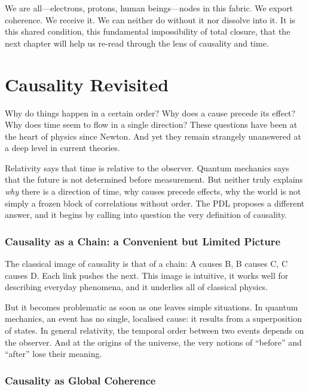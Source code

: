 \documentclass[12pt, a4paper, openright]{book}
\begin{document}
\medskip

We are all---electrons, protons, human beings---nodes in this fabric. We export coherence. We receive it. We can neither do without it nor dissolve into it. It is this shared condition, this fundamental impossibility of total closure, that the next chapter will help us re-read through the lens of causality and time. 

\chapter{Causality Revisited}

Why do things happen in a certain order? Why does a cause precede its effect? Why does time seem to flow in a single direction? These questions have been at the heart of physics since Newton. And yet they remain strangely unanswered at a deep level in current theories.

\medskip

Relativity says that time is relative to the observer. Quantum mechanics says that the future is not determined before measurement. But neither truly explains \emph{why} there is a direction of time, why causes precede effects, why the world is not simply a frozen block of correlations without order. The PDL proposes a different answer, and it begins by calling into question the very definition of causality.

\subsection*{Causality as a Chain: a Convenient but Limited Picture}

The classical image of causality is that of a chain: A causes B, B causes C, C causes D. Each link pushes the next. This image is intuitive, it works well for describing everyday phenomena, and it underlies all of classical physics.

\medskip

But it becomes problematic as soon as one leaves simple situations. In quantum mechanics, an event has no single, localised cause: it results from a superposition of states. In general relativity, the temporal order between two events depends on the observer. And at the origins of the universe, the very notions of ``before'' and ``after'' lose their meaning.

\subsection*{Causality as Global Coherence}
\end{document}
